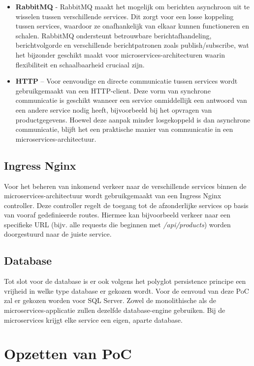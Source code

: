 \begin{itemize}
	\item \textbf{RabbitMQ} - RabbitMQ maakt het mogelijk om berichten asynchroon uit te wisselen tussen verschillende services. Dit zorgt voor een losse koppeling tussen services, waardoor ze onafhankelijk van elkaar kunnen functioneren en schalen. RabbitMQ ondersteunt betrouwbare berichtafhandeling, berichtvolgorde en verschillende berichtpatronen zoals publish/subscribe, wat het bijzonder geschikt maakt voor microservices-architecturen waarin flexibiliteit en schaalbaarheid cruciaal zijn.
	\item \textbf{HTTP} – Voor eenvoudige en directe communicatie tussen services wordt gebruikgemaakt van een HTTP-client. Deze vorm van synchrone communicatie is geschikt wanneer een service onmiddellijk een antwoord van een andere service nodig heeft, bijvoorbeeld bij het opvragen van productgegevens. Hoewel deze aanpak minder losgekoppeld is dan asynchrone communicatie, blijft het een praktische manier van communicatie in een microservices-architectuur.
\end{itemize}

\subsection{Ingress Nginx}

Voor het beheren van inkomend verkeer naar de verschillende services binnen de microservices-architectuur wordt gebruikgemaakt van een Ingress Nginx controller. Deze controller regelt de toegang tot de afzonderlijke services op basis van vooraf gedefinieerde routes. Hiermee kan bijvoorbeeld verkeer naar een specifieke URL (bijv. alle requests die beginnen met \textit{/api/products}) worden doorgestuurd naar de juiste service.

\subsection{Database}

Tot slot voor de database is er ook volgens het polyglot persistence principe een vrijheid in welke type database er gekozen wordt. Voor de eenvoud van deze PoC zal er gekozen worden voor SQL Server. Zowel de monolithische als de microservices-applicatie zullen dezelfde database-engine gebruiken. Bij de microservices krijgt elke service een eigen, aparte database.

\section{Opzetten van PoC}
\label{opzetten_poc}

